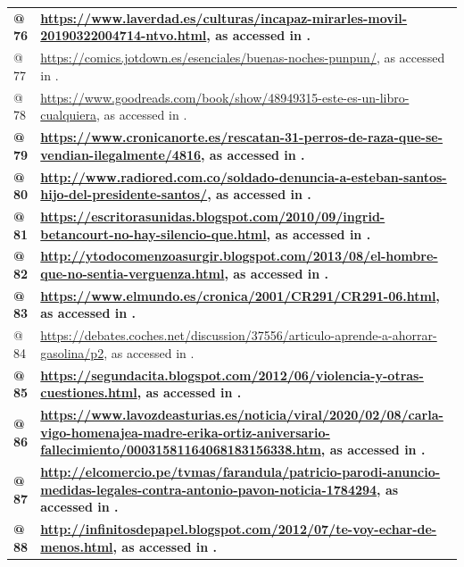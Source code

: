 \begin{tabularx}{\textwidth}{XX}
{\bfseries {@ 76} } & {\bfseries \url{https://www.laverdad.es/culturas/incapaz-mirarles-movil-20190322004714-ntvo.html}{, as accessed in \citealt{June2021}.}}\\
@ 77 & \url{https://comics.jotdown.es/esenciales/buenas-noches-punpun/}, as accessed in \citealt{June2021}.\\
@ 78 & \url{https://www.goodreads.com/book/show/48949315-este-es-un-libro-cualquiera}, as accessed in \citealt{June2021}.\\
{\bfseries {@ 79} } & {\bfseries \url{https://www.cronicanorte.es/rescatan-31-perros-de-raza-que-se-vendian-ilegalmente/4816}{, as accessed in \citealt{December2020}.}}\\
{\bfseries {@ 80} } & {\bfseries \url{http://www.radiored.com.co/soldado-denuncia-a-esteban-santos-hijo-del-presidente-santos/}{, as accessed in \citealt{March2017}.}}\\
{\bfseries {@ 81} } & {\bfseries \url{https://escritorasunidas.blogspot.com/2010/09/ingrid-betancourt-no-hay-silencio-que.html}{, as accessed in \citealt{December2020}.}}\\
{\bfseries {@ 82} } & {\bfseries \url{http://ytodocomenzoasurgir.blogspot.com/2013/08/el-hombre-que-no-sentia-verguenza.html}{, as accessed in \citealt{December2020}.}}\\
{\bfseries {@ 83} } & {\bfseries \url{https://www.elmundo.es/cronica/2001/CR291/CR291-06.html}{, as accessed in \citealt{December2020}.}}\\
@ 84 & \url{https://debates.coches.net/discussion/37556/articulo-aprende-a-ahorrar-gasolina/p2}, as accessed in \citealt{June2021}.\\
{\bfseries {@ 85} } & {\bfseries \url{https://segundacita.blogspot.com/2012/06/violencia-y-otras-cuestiones.html}{, as accessed in \citealt{December2020}.}}\\
{\bfseries {@ 86} } & {\bfseries \url{https://www.lavozdeasturias.es/noticia/viral/2020/02/08/carla-vigo-homenajea-madre-erika-ortiz-aniversario-fallecimiento/00031581164068183156338.htm}{, as accessed in \citealt{June2021}.}}\\
{\bfseries {@ 87} } & {\bfseries \url{http://elcomercio.pe/tvmas/farandula/patricio-parodi-anuncio-medidas-legales-contra-antonio-pavon-noticia-1784294}{, as accessed in \citealt{March2017}.}}\\
{\bfseries {@ 88} } & {\bfseries \url{http://infinitosdepapel.blogspot.com/2012/07/te-voy-echar-de-menos.html}{, as accessed in \citealt{June2021}.}}\\

\end{tabularx}
